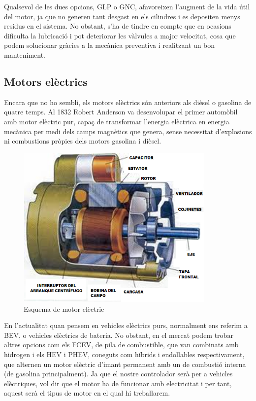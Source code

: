 Qualsevol de les dues opcions, GLP o GNC, afavoreixen l’augment de la vida útil del motor, ja que no generen tant desgast en els cilindres i es depositen menys residus en el sistema. No obstant, s’ha de tindre en compte que en ocasions dificulta la lubricació i pot deteriorar les vàlvules a major velocitat, cosa que podem solucionar gràcies a la mecànica preventiva i realitzant un bon manteniment. 

\subsection{Motors elèctrics}
Encara que no ho sembli, els motors elèctrics són anteriors als dièsel o gasolina de quatre temps. Al 1832 Robert Anderson va desenvolupar el primer automòbil amb motor elèctric pur, capaç de transformar l’energia elèctrica en energia mecànica per medi dels camps magnètics que genera, sense necessitat d’explosions ni combustions pròpies dels motors gasolina i dièsel.

\begin{figure}[H]
		\centering
    	\includegraphics[width=\textwidth, height=8cm]{Motors/motorelectrico.png}
     	\caption{Esquema de motor elèctric} 
\end{figure}

En l’actualitat quan pensem en vehicles elèctrics purs, normalment ens referim a BEV, o vehicles elèctrics de bateria. No obstant, en el mercat podem trobar altres opcions com els FCEV, de pila de combustible, que van combinats amb hidrogen i els HEV i PHEV, coneguts com híbrids i endollables respectivament, que alternen un motor elèctric d’imant permanent amb un de combustió interna (de gasolina principalment). Ja que el nostre controlador serà per a vehicles elèctriques, vol dir que el motor ha de funcionar amb electricitat i per tant, aquest serà el tipus de motor en el qual hi treballarem.


